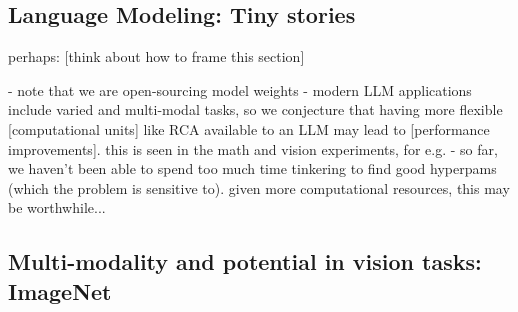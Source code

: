 \subsection{Language Modeling: Tiny stories}\label{ssec:tiny_stories}

perhaps: [think about how to frame this section] 

- note that we are open-sourcing model weights
- modern LLM applications include varied and multi-modal tasks, so we conjecture that having more flexible [computational units] like RCA available to an LLM may lead to [performance improvements]. this is seen in the math and vision experiments, for e.g.
- so far, we haven't been able to spend too much time tinkering to find good hyperpams (which the problem is sensitive to). given more computational resources, this may be worthwhile...


\subsection{Multi-modality and potential in vision tasks: ImageNet}\label{ssec:imagenett}
